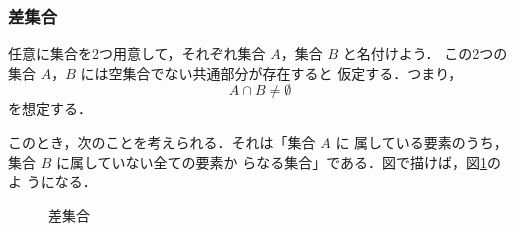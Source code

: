                 \subsubsection{差集合}
                    任意に集合を2つ用意して，それぞれ集合 $A$，集合 $B$ と名付けよう．
                    この2つの集合 $A$，$B$ には空集合でない共通部分が存在すると
                    仮定する．つまり，
                        \begin{equation*}
                            A\cap B \neq \emptyset
                        \end{equation*}
                    を想定する．

                    このとき，次のことを考えられる．それは「集合 $A$ に
                    属している要素のうち，集合 $B$ に属していない全ての要素か
                    らなる集合」である．図で描けば，図\ref{fig:sa_shugo1}のよ
                    うになる．
                        \begin{figure}[hbt]
                            \begin{center}
                                \caption{差集合}
                                \label{fig:sa_shugo1}
                            \end{center}
                        \end{figure}

